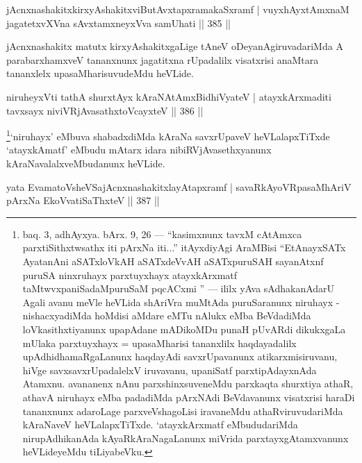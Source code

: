\begin{shl}
jAcnxnashakitxkirxyAshakitxviButAvxtapxramakaSxramf |
vuyxhAyx\s \s tAmxnaM jagatetxvXVna sAvxtamxneyxVva samUhati \hfill || 385 ||
\end{shl}

\begin{artha}
jAcnxnashakitx matutx kirxyAshakitxgaLige tAneV oDeyanAgiruvadariMda A parabarxhamxveV tananxnunx jagatitxna rUpadalilx visatxrisi anaMtara tananxlelx upasaMharisuvudeMdu heVLide.
\end{artha}


\begin{shl}
niruheyxVti tathA shurxtAyx kAraNAtAmx\s BidhiVyateV |
atayxkArxmaditi tavxsayx niviVRjAvasathxtoVcayxteV \hfill || 386 ||
\end{shl}

\begin{artha}
\footnote[1]{baq. 3, adhAyxya. bArx. 9, 26  {\rm ---}  ``kasimxnunx tavxM cAtAmxca parxtiSithxtwsathx iti pArxNa iti...'' itAyxdiyAgi AraMBisi ``EtAnayxSATx AyatanAni aSATxloVkAH aSATxdeVvAH aSATxpuruSAH sayanAtxnf puruSA ninxruhayx parxtuyxhayx atayxkArxmatf taMtwvxpaniSadaMpuruSaM pqcACxmi ''  {\rm ---}  ililx yAva sAdhakanAdarU Agali avanu meVle heVLida shAriVra muMtAda puruSaranunx niruhayx - nishacxyadiMda hoMdisi aMdare eMTu nAlukx eMba  BeVdadiMda loVkasithxtiyanunx upapAdane mADikoMDu punaH pUvARdi dikukxgaLa mUlaka parxtuyxhayx = upasaMharisi tananxlilx haqdayadalilx upAdhidhamaRgaLanunx haqdayAdi savxrUpavanunx atikarxmisiruvanu, hiVge savxsavxrUpadalelxV iruvavanu, upaniSatf parxtipAdayxnAda Atamxnu. avananenx nAnu parxshinxsuveneMdu parxkaqta shurxtiya athaR, athavA niruhayx eMba padadiMda pArxNAdi BeVdavanunx visatxrisi haraDi tananxnunx adaroLage parxveVshagoLisi iravaneMdu athaRviruvudariMda kAraNaveV heVLalapxTiTxde. `atayxkArxmatf eMbududariMda nirupAdhikanAda kAyaRkAraNagaLanunx miVrida parxtayxgAtamxvanunx heVLideyeMdu tiLiyabeVku.}`niruhayx' eMbuva shabadxdiMda kAraNa savxrUpaveV heVLalapxTiTxde `atayxkAmatf' eMbudu mAtarx idara nibiRVjAvasethxyanunx kAraNavalalxveMbudanunx heVLide.
\end{artha}

\begin{shl}
yata EvamatoV\s sheVSajAcnxnashakitxlayAtapxramf |
\footnotemark[2]savaRkAyoVRpasaMhAriV pArxNa EkoV\s vatiSaThxteV \hfill || 387 ||
\end{shl}


